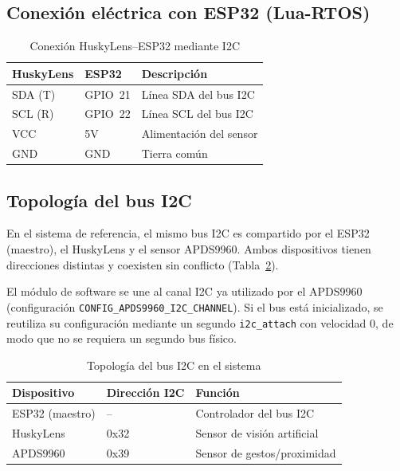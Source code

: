 \documentclass{prgrado}
\begin{document}
\subsection{Conexión eléctrica con ESP32 (Lua-RTOS)}

\begin{table}[htbp]
\centering
\caption{Conexión HuskyLens--ESP32 mediante I2C}
\label{tab:conexion_huskylens_esp32}
\begin{tabular}{|l|l|l|}
\hline
\textbf{HuskyLens} & \textbf{ESP32} & \textbf{Descripción} \\ \hline
SDA (T)   & GPIO~21 & Línea SDA del bus I2C \\ \hline
SCL (R)   & GPIO~22 & Línea SCL del bus I2C \\ \hline
VCC       & 5V      & Alimentación del sensor \\ \hline
GND       & GND     & Tierra común \\ \hline
\end{tabular}
\end{table}

\subsection{Topología del bus I2C}

En el sistema de referencia, el mismo bus I2C es compartido por el ESP32 (maestro), el HuskyLens y el sensor APDS9960. Ambos dispositivos tienen direcciones distintas y coexisten sin conflicto (Tabla~\ref{tab:topologia_i2c}).

El módulo de software se une al canal I2C ya utilizado por el APDS9960 (configuración \texttt{CONFIG\_APDS9960\_I2C\_CHANNEL}). Si el bus está inicializado, se reutiliza su configuración mediante un segundo \texttt{i2c\_attach} con velocidad 0, de modo que no se requiera un segundo bus físico.

\begin{table}[htbp]
\centering
\caption{Topología del bus I2C en el sistema}
\label{tab:topologia_i2c}
\begin{tabular}{|l|l|l|}
\hline
\textbf{Dispositivo} & \textbf{Dirección I2C} & \textbf{Función} \\ \hline
ESP32 (maestro) & --    & Controlador del bus I2C \\ \hline
HuskyLens        & 0x32 & Sensor de visión artificial \\ \hline
APDS9960         & 0x39 & Sensor de gestos/proximidad \\ \hline
\end{tabular}
\end{table}
\end{document}
